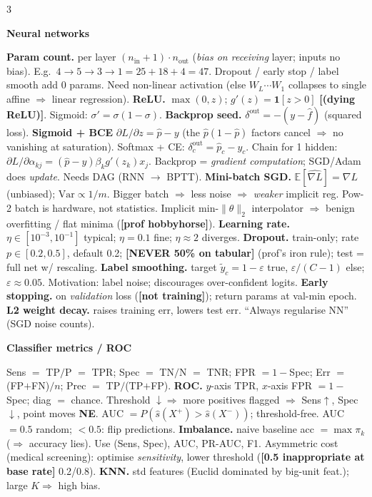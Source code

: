 \documentclass[a4paper,8pt]{extarticle}
\renewcommand{\section}[1]{\par\vspace{2pt}\noindent\colorbox{black!15}{\parbox{0.97\linewidth}{\strut\bfseries\small #1}}\par\vspace{1pt}}
\newcommand{\hd}[1]{\textbf{#1.}}
\newcommand{\tr}[1]{\textcolor{red!70!black}{\textbf{[#1]}}} %
\newcommand{\E}{\mathbb{E}}
\newcommand{\Var}{\mathrm{Var}}
\begin{document}
\begin{multicols*}{3}
\section{Neural networks}
\hd{Param count} per layer $(n_{\text{in}}{+}1)\cdot n_{\text{out}}$ (\emph{bias on receiving} layer; inputs no bias). E.g.\ $4\!\to\!5\!\to\!3\!\to\!1 = 25{+}18{+}4=47$. Dropout / early stop / label smooth add 0 params.
Need non-linear activation (else $W_L\!\cdots\!W_1$ collapses to single affine $\Rightarrow$ linear regression).
\hd{ReLU} $\max(0,z)$; $g'(z)=\mathbf{1}[z>0]$ \tr{(dying ReLU)}. Sigmoid: $\sigma'=\sigma(1-\sigma)$.
\hd{Backprop seed} $\delta^{\text{out}}=-(y-\hat f)$ (squared loss). \textbf{Sigmoid + BCE} $\partial L/\partial z=\hat p-y$ (the $\hat p(1-\hat p)$ factors cancel $\Rightarrow$ no vanishing at saturation). Softmax + CE: $\delta^{\text{out}}_c=\hat p_c-y_c$. Chain for 1 hidden: $\partial L/\partial\alpha_{kj}=(\hat p-y)\beta_k g'(z_k)x_j$.
Backprop = \emph{gradient computation}; SGD/Adam does \emph{update}. Needs DAG (RNN $\to$ BPTT).
\hd{Mini-batch SGD} $\E[\widehat{\nabla L}]=\nabla L$ (unbiased); $\Var\propto 1/m$. Bigger batch $\Rightarrow$ less noise $\Rightarrow$ \emph{weaker} implicit reg. Pow-2 batch is hardware, not statistics. Implicit min-$\|\theta\|_2$ interpolator $\Rightarrow$ benign overfitting / flat minima (\tr{prof hobbyhorse}).
\hd{Learning rate} $\eta\in[10^{-3},10^{-1}]$ typical; $\eta=0.1$ fine; $\eta\approx 2$ diverges.
\hd{Dropout} train-only; rate $p\in[0.2,0.5]$, default 0.2; \tr{NEVER 50\% on tabular} (prof's iron rule); test = full net w/ rescaling.
\hd{Label smoothing} target $\tilde y_c=1-\varepsilon$ true, $\varepsilon/(C-1)$ else; $\varepsilon\!\approx\!0.05$. Motivation: label noise; discourages over-confident logits.
\hd{Early stopping} on \emph{validation} loss (\tr{not training}); return params at val-min epoch.
\hd{L2 weight decay} raises training err, lowers test err. ``Always regularise NN'' (SGD noise counts).

\section{Classifier metrics / ROC}
Sens $=$ TP$/$P $=$ TPR; Spec $=$ TN$/$N $=$ TNR; FPR $=1-$Spec; Err $=$ (FP$+$FN)$/n$; Prec $=$ TP$/$(TP$+$FP).
\hd{ROC} $y$-axis TPR, $x$-axis FPR $=1-$Spec; diag $=$ chance.
Threshold $\downarrow\Rightarrow$ more positives flagged $\Rightarrow$ Sens$\uparrow$, Spec$\downarrow$, point moves \textbf{NE}.
AUC $=P(\hat s(X^+)>\hat s(X^-))$; threshold-free. AUC $=0.5$ random; $<0.5$: flip predictions.
\hd{Imbalance} naive baseline acc $=\max\pi_k$ ($\Rightarrow$ accuracy lies). Use (Sens, Spec), AUC, PR-AUC, F1. Asymmetric cost (medical screening): optimise \emph{sensitivity}, lower threshold (\tr{0.5 inappropriate at base rate} 0.2/0.8).
\hd{KNN} std features (Euclid dominated by big-unit feat.); large $K\Rightarrow$ high bias.


\end{multicols*}
\end{document}
